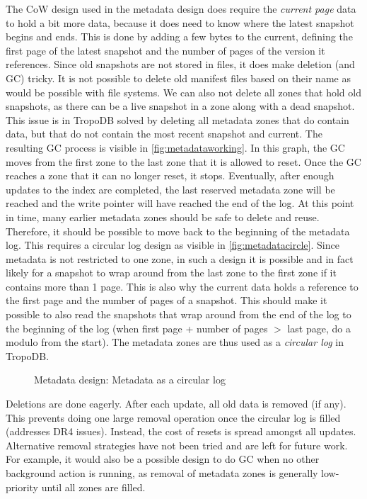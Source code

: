 The CoW design used in the metadata design does require the \textit{current page} data to hold a bit more data, because it does need to know where the latest snapshot begins and ends. This is done by adding a few bytes to the current, defining the first page of the latest snapshot and the number of pages of the version it references. Since old snapshots are not stored in files, it does make deletion (and GC) tricky. It is not possible to delete old manifest files based on their name as would be possible with file systems. We can also not delete all zones that hold old snapshots, as there can be a live snapshot in a zone along with a dead snapshot. This issue is in TropoDB solved by deleting all metadata zones that do contain data, but that do not contain the most recent snapshot and current. The resulting GC process is visible in \autoref{fig:metadataworking}. In this graph, the GC moves from the first zone to the last zone that it is allowed to reset. Once the GC reaches a zone that it can no longer reset, it stops. Eventually, after enough updates to the index are completed, the last reserved metadata zone will be reached and the write pointer will have reached the end of the log. At this point in time, many earlier metadata zones should be safe to delete and reuse. Therefore, it should be possible to move back to the beginning of the metadata log. This requires a circular log design as visible in \autoref{fig:metadatacircle}. Since metadata is not restricted to one zone, in such a design it is possible and in fact likely for a snapshot to wrap around from the last zone to the first zone if it contains more than 1 page. This is also why the current data holds a reference to the first page and the number of pages of a snapshot. This should make it possible to also read the snapshots that wrap around from the end of the log to the beginning of the log (when first page + number of pages $>$ last page, do a modulo from the start). The metadata zones are thus used as a \textit{circular log} in TropoDB. 

\begin{figure}[h]
\centering
\begin{minipage}{0.35\textwidth}
  \centering
  
\end{minipage}%
\caption{Metadata design: Metadata as a circular log}
\label{fig:metadatacircle}
\end{figure}

Deletions are done eagerly. After each update, all old data is removed (if any). This prevents doing one large removal operation once the circular log is filled (addresses DR4 issues). Instead, the cost of resets is spread amongst all updates. Alternative removal strategies have not been tried and are left for future work. For example, it would also be a possible design to do GC when no other background action is running, as removal of metadata zones is generally low-priority until all zones are filled.  

